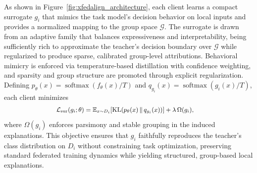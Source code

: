 \documentclass{article}
\theoremstyle{plain}
\theoremstyle{definition}
\theoremstyle{remark}
\begin{document}
As shown in Figure~\ref{fig:xfedalign_architecture}, each client learns a compact surrogate $g_i$ that mimics the task model’s decision behavior on local inputs and provides a normalized mapping to the group space $\mathcal{G}$. The surrogate is drawn from an adaptive family that balances expressiveness and interpretability, being sufficiently rich to approximate the teacher’s decision boundary over $\mathcal{G}$ while regularized to produce sparse, calibrated group-level attributions. Behavioral mimicry is enforced via temperature-based distillation with confidence weighting, and sparsity and group structure are promoted through explicit regularization. Defining $p_\theta(x)=\operatorname{softmax}(f_\theta(x)/T)$ and $q_{g_i}(x)=\operatorname{softmax}(g_i(x)/T)$, each client minimizes
\begin{equation}
\label{eq:surrogate-iclr}
{\small
\begin{aligned}
\mathcal{L}_{\mathrm{sur}}(g_i;\theta)
&=\mathbb{E}_{x\sim D_i}\!\left[\mathrm{KL}\!\left(p_\theta(x)\,\|\,q_{g_i}(x)\right)\right]
+\lambda\,\Omega(g_i),
\end{aligned}
}
\end{equation}
where $\Omega(g_i)$ enforces parsimony and stable grouping in the induced explanations. This objective ensures that $g_i$ faithfully reproduces the teacher’s class distribution on $D_i$ without constraining task optimization, preserving standard federated training dynamics while yielding structured, group-based local explanations.
\end{document}
